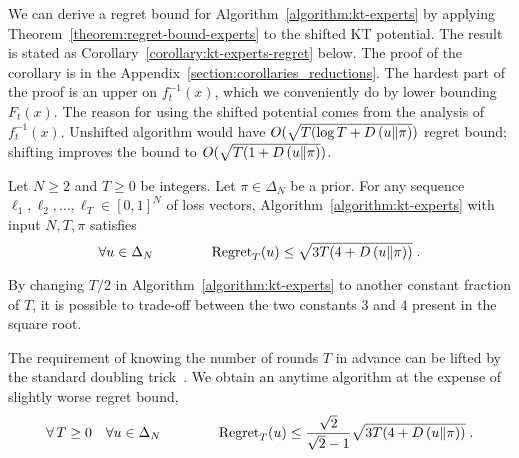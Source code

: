 We can derive a regret bound for Algorithm~\ref{algorithm:kt-experts} by
applying Theorem~\ref{theorem:regret-bound-experts} to the shifted KT potential.
The result is stated as Corollary~\ref{corollary:kt-experts-regret} below. The
proof of the corollary is in the Appendix~\ref{section:corollaries_reductions}. The
hardest part of the proof is an upper on $f_t^{-1}(x)$, which we conveniently do
by lower bounding $F_t(x)$. The reason for using the shifted potential comes
from the analysis of $f_t^{-1}(x)$. Unshifted algorithm would have $O(\sqrt{T
(\log T + D\left({u}\middle\|{\pi}\right)})$ regret bound; shifting improves the bound to $O(\sqrt{T
(1 + D\left({u}\middle\|{\pi}\right)})$.

\begin{corollary}
\label{corollary:kt-experts-regret}
Let $N \ge 2$ and $T \ge 0$ be integers. Let $\pi \in \Delta_N$ be a prior.
For any sequence $\ell_1, \ell_2, \dots, \ell_T \in
[0,1]^N$ of loss vectors, Algorithm~\ref{algorithm:kt-experts}
with input $N,T,\pi$ satisfies
$$
\forall u \in \Delta_N \qquad \qquad \operatorname{Regret}_T(u) \le \sqrt{3T (4 + D\left({u}\middle\|{\pi}\right))} \; .
$$
\end{corollary}
By changing $T/2$ in Algorithm~\ref{algorithm:kt-experts} to another constant
fraction of $T$, it is possible to trade-off between the two constants $3$ and
$4$ present in the square root.

The requirement of knowing the number of rounds $T$ in advance can be lifted by
the standard doubling trick~\citep[Section 2.3.1]{Shalev-Shwartz12}. We obtain
an anytime algorithm at the expense of slightly worse regret bound,
$$
\forall \, T \ge 0 \quad \forall u \in \Delta_N \qquad \qquad
\operatorname{Regret}_T(u) \le \frac{\sqrt{2}}{\sqrt{2} - 1} \sqrt{3T (4 + D\left({u}\middle\|{\pi}\right))} \; .
$$
